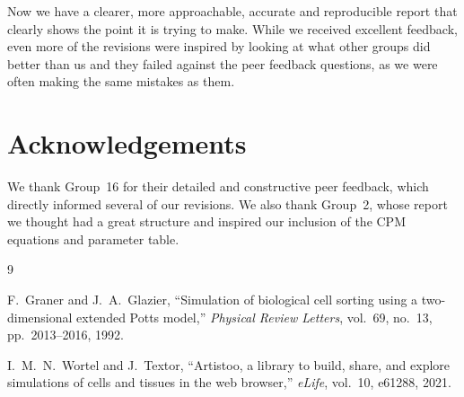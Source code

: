 \documentclass{article}
\begin{document}
Now we have a clearer, more approachable, accurate and reproducible report that clearly shows the point it is trying to make. While we received excellent feedback, even more of the revisions were inspired by looking at what other groups did better than us and they failed against the peer feedback questions, as we were often making the same mistakes as them. 

\section*{Acknowledgements}
We thank Group~16 for their detailed and constructive peer feedback, which directly informed several of our revisions. We also thank Group~2, whose report we thought had a great structure and inspired our inclusion of the CPM equations and parameter table.

\begin{thebibliography}{9}

F.~Graner and J.~A.~Glazier,
``Simulation of biological cell sorting using a two-dimensional extended Potts model,''
\textit{Physical Review Letters}, vol.~69, no.~13, pp.~2013--2016, 1992.

I.~M.~N.~Wortel and J.~Textor,
``Artistoo, a library to build, share, and explore simulations of cells and tissues in the web browser,''
\textit{eLife}, vol.~10, e61288, 2021.

\end{thebibliography}
\end{document}

